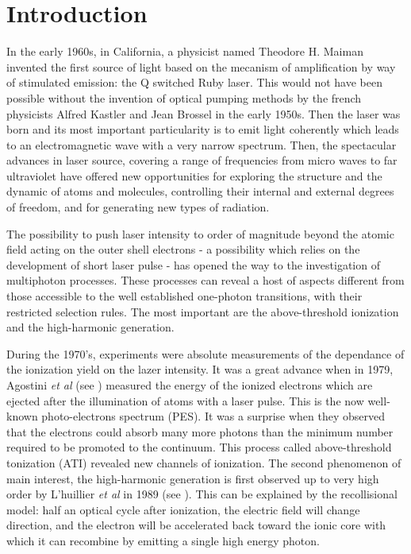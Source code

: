 \documentclass[a4paper]{article}
\begin{document}
\newpage
\unboldmath{\tableofcontents}
\newpage

\section{Introduction}

In the early 1960s, in California, a physicist named Theodore H. Maiman invented the first source of light based on the mecanism of amplification by way of stimulated emission: the Q switched Ruby laser. This would not have been possible without the invention of optical pumping methods by the french physicists Alfred Kastler and Jean Brossel in the early 1950s. Then the laser was born and its most important particularity is to emit light coherently which leads to an electromagnetic wave with a very narrow spectrum.
Then, the spectacular advances in laser source, covering a range of frequencies from micro waves to far ultraviolet have offered new opportunities for exploring the structure and the dynamic of atoms and molecules, controlling their internal and external degrees of freedom, and for generating new types of radiation. 
\par
The possibility to push laser intensity to order of magnitude beyond the atomic field acting on the outer shell electrons - a possibility which relies on the development of short laser pulse - has opened the way to the investigation of multiphoton processes. These processes can reveal a host of aspects different from those accessible to the well established one-photon transitions, with their restricted selection rules.
The most important are the above-threshold ionization and the high-harmonic generation.
\par
During the 1970's, experiments were absolute measurements of the dependance of the ionization yield on the lazer intensity.
It was a great advance when in 1979, Agostini \textit{et al} (see \cite{Agostini_1979}) measured the energy of the ionized electrons which are ejected after the illumination of atoms with a laser pulse. This is the now well-known photo-electrons spectrum (PES). It was a surprise when they observed that the electrons could absorb many more photons than the minimum number required to be promoted to the continuum. This process called above-threshold tonization (ATI) revealed new channels of ionization.
The second phenomenon of main interest, the high-harmonic generation is first observed up to very high order by L'huillier \textit{et al} in 1989 (see \cite{Li_1989}). This can be explained by the recollisional model: half an optical cycle after ionization, the electric field will change direction, and the electron will be accelerated back toward the ionic core with which it can recombine by emitting a single high energy photon. 
\end{document}
